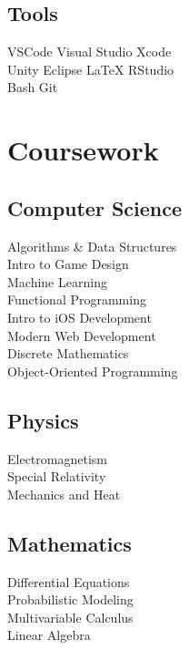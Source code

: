 \documentclass[]{main}
\begin{document}
\begin{minipage}[t]{0.33\textwidth}
\subsection{Tools}
VSCode \textbullet{} Visual Studio \textbullet{} Xcode \textbullet{} \\ Unity \textbullet{} Eclipse \textbullet{} \LaTeX \textbullet{} RStudio \textbullet{} \\ Bash \textbullet{} Git
\sectionsep


\section{Coursework}
\subsection{Computer Science}
Algorithms \& Data Structures \\
Intro to Game Design \\
Machine Learning \\
Functional Programming \\
Intro to iOS Development \\
Modern Web Development \\
Discrete Mathematics \\
Object-Oriented Programming \\
\sectionsep
\subsection{Physics}
Electromagnetism \\
Special Relativity \\
Mechanics and Heat \\
\sectionsep
\subsection{Mathematics}
Differential Equations \\
Probabilistic Modeling \\
Multivariable Calculus \\
Linear Algebra \\
\sectionsep

%
%

\end{minipage} 
\end{document}
